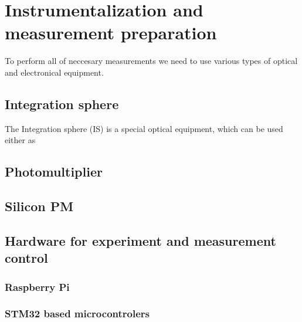 
\chapter{Instrumentalization and measurement preparation}
To perform all of neccesary measurements we need to use various types of optical and electronical equipment.
\section{Integration sphere}
The Integration sphere (IS) is a special optical equipment, which can be used either as 

\section{Photomultiplier}


\section{Silicon PM}


\section{Hardware for experiment and measurement control}
\subsection{Raspberry Pi}

\subsection{STM32 based microcontrolers}
